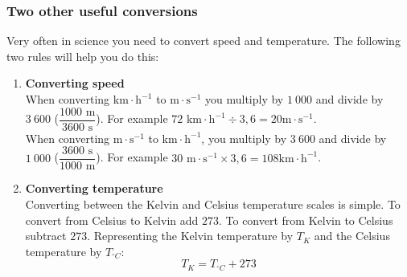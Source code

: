 \subsubsection*{Two other useful conversions}
            \nopagebreak
Very often in science you need to convert speed and temperature. The following two rules will help you do this:
\begin{enumerate}[label=\textbf{\arabic*}.]
\item \textbf{Converting speed}\\
When converting $\text{km} \cdot \text{h}^{-1}$ to $\text{m} \cdot \text{s}^{-1}$ you multiply by $1~000$ and divide by $3~600$ ($\dfrac{1000 \text{ m}}{3600 \text{ s}}$). For example $72 \text{ km} \cdot \text{h}^{-1} \div 3,6 = 20 \text{m}\cdot \text{s}^{-1}$.\\  
When converting $\text{m}\cdot \text{s}^{-1}$ to $\text{km} \cdot \text{h}^{-1}$, you multiply by $3~600$ and divide by $1~000$ ($\dfrac{3600 \text{ s}}{1000 \text{ m}}$). For example $30 \text{ m}\cdot \text{s}^{-1} \times 3,6 = 108 \text{km} \cdot \text{h}^{-1}$. 
\item \textbf{Converting temperature}\\
Converting between the Kelvin and Celsius temperature scales is simple. To convert from Celsius to Kelvin add $273$. To convert from Kelvin to Celsius subtract $273$. Representing the Kelvin temperature by ${T}_{K}$ and the Celsius temperature by ${T}_{^{\circ}C}$:         
    \begin{equation*}
    {T}_{K}={T}_{^{\circ}C} + 273
      \end{equation*}
\end{enumerate}


